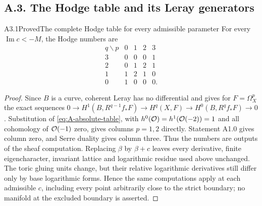 \subsection{A.3. The Hodge table and its Leray generators}

\begin{claim}{A3.1}{Proved}{The complete Hodge table for every admissible parameter}
For every $\operatorname{Im}c<-M$, the Hodge numbers are
\[
\begin{array}{c|rrrr}
q\backslash p&0&1&2&3\\\hline
3&0&0&0&1\\
2&0&1&2&1\\
1&1&2&1&0\\
0&1&0&0&0.
\end{array}
\]
\end{claim}
\begin{proof}
Since $B$ is a curve, coherent Leray has no differential and gives
for $F=\Omega_X^p$ the exact sequences
$0\to H^1(B,R^{q-1}f_*F)\to H^q(X,F)\to H^0(B,R^qf_*F)\to0$.
Substitution of \eqref{eq:A-absolute-table}, with
$h^0(\mathcal O)=h^1(\mathcal O(-2))=1$ and all cohomology of $\mathcal O(-1)$ zero,
gives columns $p=1,2$ directly.  Statement A1.0 gives column zero,
and Serre duality gives column three.  Thus the numbers are outputs
of the sheaf computation.  Replacing $\beta$ by $\beta+c$ leaves
every derivative, finite eigencharacter, invariant lattice and
logarithmic residue used above unchanged.  The toric gluing units
change, but their relative logarithmic derivatives still differ only
by base logarithmic forms.  Hence the same computations apply at
each admissible $c$, including every point arbitrarily close to the
strict boundary; no manifold at the excluded boundary is asserted.
\end{proof}

